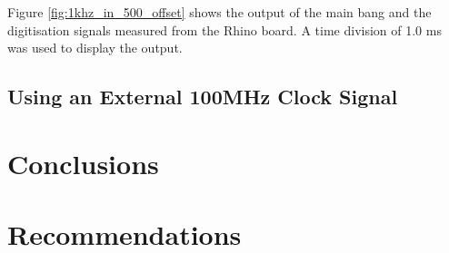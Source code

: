 \documentclass[12pt, a4paper]{article}
\begin{document}
Figure \ref{fig:1khz_in_500_offset} shows the output of the main bang and the digitisation signals measured from the Rhino board. A time division of 1.0 ms was used to display the output.

\subsection{Using an External 100MHz Clock Signal}


\section{Conclusions}

\section{Recommendations}
\end{document}
